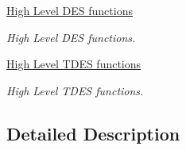 \begin{DoxyCompactItemize}
\hyperlink{group___c_r_y_p___group8}{High Level D\-E\-S functions}
\begin{DoxyCompactList}\small\item\em High Level D\-E\-S functions. \end{DoxyCompactList}\item 
\hyperlink{group___c_r_y_p___group7}{High Level T\-D\-E\-S functions}
\begin{DoxyCompactList}\small\item\em High Level T\-D\-E\-S functions. \end{DoxyCompactList}\end{DoxyCompactItemize}


\subsection{Detailed Description}
